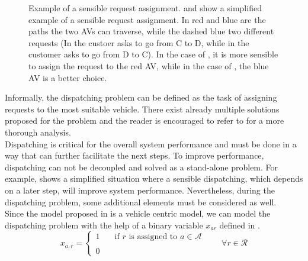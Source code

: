 \begin{figure}
\begin{subfigure}{0.5\linewidth}
		\caption{}
		\label{fig:req_notassignable}
	\end{subfigure}
	\caption[Example of a sensible request assignment]{Example of a sensible request assignment.  and  show a simplified example of a sensible request assignment. In red and blue are the paths the two AVs can traverse, while the dashed blue two different requests (In  the custoer asks to go from C to D, while in  the customer asks to go from D to C). In the case of , it is more sensible to assign the request to the red AV, while in the case of , the blue AV is a better choice. }
	\label{fig:sens_assignment}
\end{figure}

Informally, the dispatching problem can be defined as the task of assigning requests to the most suitable vehicle. There exist already multiple solutions proposed for the problem and the reader is encouraged to refer to  for a more thorough analysis. \\
Dispatching is critical for the overall system performance and must be done in a way that can further facilitate the next steps. To improve performance, dispatching can not be decoupled and solved as a stand-alone problem. For example,  shows a simplified situation where a sensible dispatching, which depends on a later step, will improve system performance. Nevertheless, during the dispatching problem, some additional elements must be considered as well. \\
Since the model proposed in  is a vehicle centric model, we can model the dispatching problem with the help of a binary variable $x_{ar}$ defined in . 
\begin{equation}
	x_{a,r} = 
	\begin{cases} 
		1 & \quad \text{if $r$ is assigned to } a \in \mathcal{A}\\
		\\
		0
	\end{cases}
	\quad\quad \forall r \in \mathcal{R}
	\label{eq:dispatching_var}
\end{equation}

